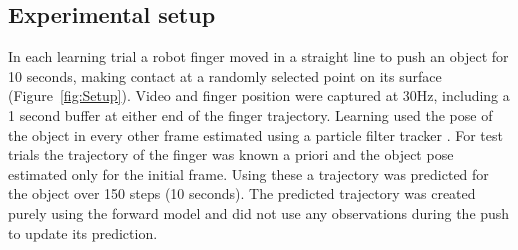 


\subsection{Experimental setup}\label{sec:Experiment.Setup}

In each learning trial a robot finger moved in a straight line to push
an object for 10 seconds, making contact at a randomly selected point
on its surface (Figure~\ref{fig:Setup}). Video and finger position were captured at 30Hz, including a 1 second buffer at either end of the finger trajectory. Learning used the pose of the object in every other frame estimated using a particle filter tracker \cite{morwald_edge_2009}. For test trials the trajectory of the finger was known a priori and the object pose estimated only for the initial frame. Using these a trajectory was predicted for the object over 150 steps (10 seconds). The predicted trajectory was created purely using the forward model and did not use any observations during the push to update its prediction.


